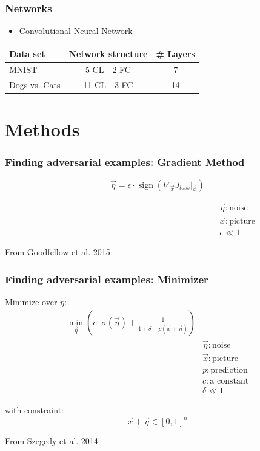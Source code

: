 \documentclass[handout]{beamer}
\begin{document}
\begin{frame}
\frametitle{Networks}
\begin{itemize}
\item Convolutional Neural Network
\end{itemize}
\begin{table}
\centering
\begin{tabular}{l c c} 
\toprule
Data set & Network structure & \# Layers \\ 
\midrule
MNIST & 5 CL - 2 FC & 7 \\  
Dogs vs. Cats & 11 CL - 3 FC & 14 \\
\bottomrule 
\end{tabular} 
\end{table}
\end{frame}

\section{Methods}

\begin{frame}
\frametitle{Finding adversarial examples: Gradient Method}

\begin{equation*}
\vec{\eta} = \epsilon \cdot \operatorname{sign} \left( \nabla_{\vec{x}} J_{loss} \big \vert_{\vec{x}} \right) 
\end{equation*}

\begin{align*}
\hspace{18em} &\vec{\eta}: \text{noise} \\
\hspace{18em} &\vec{x}: \text{picture} \\
\hspace{18em} &\epsilon \ll 1 
\end{align*}

From Goodfellow et al. 2015

\end{frame}

\begin{frame}
\frametitle{Finding adversarial examples: Minimizer}

Minimize over $\eta$:
\begin{align*}
\min_{\vec{\eta}} \left( c \cdot \sigma(\vec{\eta}) + \frac{1}{1 + \delta - p(\vec{x}+\vec{\eta})} \right)  & \\
&\vec{\eta}: \text{noise} \\
&\vec{x}: \text{picture} \\
&p: \text{prediction} \\
&c: \text{a constant} \\
&\delta \ll 1 
\end{align*}

with constraint:
\begin{equation*}
\vec{x}+\vec{\eta}\in [0,1]^n
\end{equation*}

From Szegedy et al. 2014
\end{frame}
\end{document}
